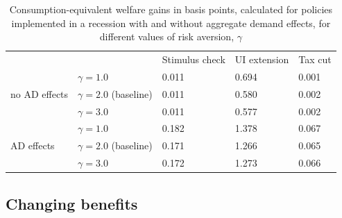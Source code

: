 \documentclass[\econtexRoot/EGMN]{subfiles}
\begin{document}
\begin{table}[]
    \begin{center}
        \begin{tabular}{@{}lllll@{}}
            \toprule
                                           &                           & Stimulus check & UI extension & Tax cut \\ \cmidrule(l){1-5}
            \multirow{3}{*}{no AD effects} & $\gamma = 1.0$            & 0.011          & 0.694        & 0.001   \\
                                           & $\gamma = 2.0$ (baseline) & 0.011          & 0.580        & 0.002   \\
                                           & $\gamma = 3.0$            & 0.011          & 0.577        & 0.002   \\ \cmidrule(l){1-5}
            \multirow{3}{*}{AD effects}    & $\gamma = 1.0$            & 0.182          & 1.378        & 0.067   \\
                                           & $\gamma = 2.0$ (baseline) & 0.171          & 1.266        & 0.065   \\
                                           & $\gamma = 3.0$            & 0.172          & 1.273        & 0.066   \\ \cmidrule(l){1-5}
        \end{tabular}
        \caption{Consumption-equivalent welfare gains in basis points, calculated for policies implemented in a recession with and without aggregate demand effects, for different values of risk aversion, $\gamma$}
        \notinsubfile{\label{tab:robustness_gamma_results}}
    \end{center}
\end{table}



\hypertarget{changing-benefits}{}\subsection{Changing benefits}
\notinsubfile{\label{sec:robust_benefits}}
\end{document}
